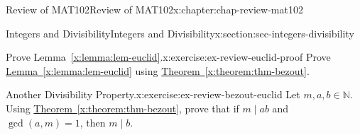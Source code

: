 \documentclass[oneside,10pt,]{book}
\newcommand{\xreffont}{\relax}
\numberwithin{equation}{section}
\begin{document}
\begin{chapterptx}{Review of MAT102}{}{Review of MAT102}{}{}{x:chapter:chap-review-mat102}
\begin{sectionptx}{Integers and Divisibility}{}{Integers and Divisibility}{}{}{x:section:sec-integers-divisibility}
\begin{inlineexercise}{Prove Lemma~{\xreffont\ref*{x:lemma:lem-euclid}}.}{x:exercise:ex-review-euclid-proof}%
Prove \hyperref[x:lemma:lem-euclid]{Lemma~{\xreffont\ref{x:lemma:lem-euclid}}} using \hyperref[x:theorem:thm-bezout]{Theorem~{\xreffont\ref{x:theorem:thm-bezout}}}.%
\end{inlineexercise}
\begin{inlineexercise}{Another Divisibility Property.}{x:exercise:ex-review-bezout-euclid}%
Let \(m,a,b \in \mathbb{N}\). Using \hyperref[x:theorem:thm-bezout]{Theorem~{\xreffont\ref{x:theorem:thm-bezout}}}, prove that if \(m \mid ab\) and \(\gcd(a,m) = 1\), then \(m \mid b\).%
\end{inlineexercise}
\end{sectionptx}
\end{chapterptx}
%
%
\typeout{************************************************}
\typeout{************************************************}
%
\end{document}
